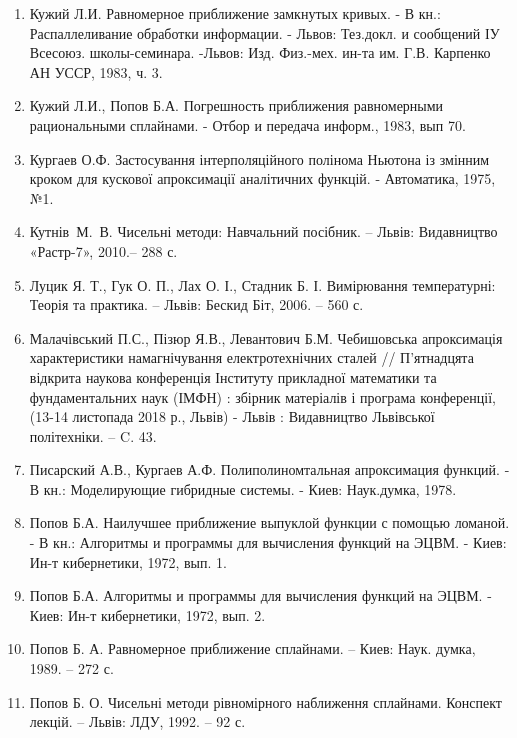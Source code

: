 \documentclass[ukrainian,14pt]{extarticle}
\begin{document}
\begin{enumerate}
\item Кужий Л.И. Равномерное приближение замкнутых кривых. - В кн.: Распаллеливание обработки информации. - Львов: Тез.докл. и сообщений ІУ Всесоюз. школы-семинара. -Львов: Изд. Физ.-мех. ин-та им. Г.В. Карпенко АН УССР, 1983, ч. 3.

\item Кужий Л.И., Попов Б.А. Погрешность приближения равномерными рациональными сплайнами. - Отбор и передача информ., 1983, вып 70.

\item Кургаев О.Ф. Застосування інтерполяційного полінома Ньютона із змінним кроком для кускової апроксимації аналітичних функцій. - Автоматика, 1975, №1.


\item Кутнів М. В. Чисельні методи: Навчальний посібник. – Львів:
Видавництво «Растр-7», 2010.– 288 с.

\item Луцик Я. Т., Гук О. П., Лах О. І., Стадник Б. І. Вимірювання
температурні: Теорія та практика. – Львів: Бескид Біт, 2006. – 560 с.

\item Малачівський П.С., Пізюр Я.В., Левантович Б.М. Чебишовська
апроксимація характеристики намагнічування електротехнічних сталей //
П’ятнадцята відкрита наукова конференція Інституту прикладної
математики та фундаментальних наук (ІМФН) : збірник матеріалів і
програма конференції, (13-14 листопада 2018 р., Львів) - Львів :
Видавництво Львівської політехніки. – C. 43.

\item Писарский А.В., Кургаев А.Ф. Полиполиномтальная апроксимация функций. - В кн.: Моделирующие гибридные системы. - Киев: Наук.думка, 1978.

\item Попов Б.А. Наилучшее приближение выпуклой функции с помощью ломаной. - В кн.: Алгоритмы и программы для вычисления функций на ЭЦВМ. - Киев: Ин-т кибернетики, 1972, вып. 1.

\item Попов Б.А. Алгоритмы и программы для вычисления функций на ЭЦВМ. - Киев: Ин-т кибернетики, 1972, вып. 2.

\item Попов Б. А. Равномерное приближение сплайнами. – Киев: Наук.
думка, 1989. – 272 с.

\item Попов Б. О. Чисельні методи рівномірного наближення сплайнами.
Конспект лекцій. – Львів: ЛДУ, 1992. – 92 с.


\end{enumerate}
\end{document}
